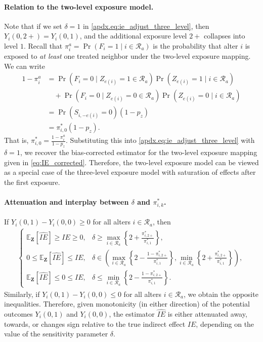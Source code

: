 \documentclass[11pt]{article}
\theoremstyle{definition}
\def \bZ {\boldsymbol{Z}}
\def \cR {\mathcal{R}}
\def \EX {\mathbb{E}}
\begin{document}
\paragraph{Relation to the two-level exposure model.}
Note that if we set $\delta=1$ in \eqref{apdx.eq:ie_adjust_three_level},
then $Y_i(0,2+) = Y_i(0,1)$, and 
the additional exposure level $2+$ collapses into level $1$.
Recall that $\pi_i^a = \Pr(F_i=1 \mid i \in \cR_a)$ is the probability
that alter $i$ is exposed to \emph{at least} one treated neighbor under the two-level exposure mapping.
We can write 
\begin{equation*}
    \begin{aligned}
        1 - \pi_i^a 
        &= \Pr(F_i=0 \mid Z_{e(i)}=1 \in \cR_a)\Pr(Z_{e(i)}=1 \mid i \in \cR_a) 
        \\ & \quad +
        \Pr(F_i=0 \mid Z_{e(i)}=0 \in \cR_a)\Pr(Z_{e(i)}=0 \mid i \in \cR_a) 
        \\  &= 
         \Pr(S_{i, -e(i)}=0)(1-p_z)
         \\ &= 
          \pi_{i,0}^* (1-p_z).
    \end{aligned}
\end{equation*}
That is, $\pi_{i,0}^* = \frac{1 - \pi_i^a}{1-p_z}$.
Substituting this into \eqref{apdx.eq:ie_adjust_three_level} with $\delta=1$,
we recover the bias-corrected estimator for the two-level exposure mapping
given in \eqref{eq:IE_corrected}.
Therefore, the two-level exposure model can be 
viewed as a special case of the three-level exposure model
with saturation of effects after the first exposure.

\paragraph{Attenuation and interplay between $\delta$ and $\pi_{i,k}^*$.}
If $Y_i(0,1) - Y_i(0,0) \geq 0$ for all alters $i \in \cR_a$, then
\begin{align*}
    \begin{cases}
        \EX_{\bZ}\left[\widehat{IE}\right] \geq IE \geq 0, & 
            \delta \geq \max_{i \in \cR_a}\left\{2 + \frac{\pi_{i,2+}^*}{\pi_{i,1}^*}\right\}, \\
        0 \leq \EX_{\bZ}\left[\widehat{IE}\right] \leq IE, & 
            \delta \in \left( \max_{i \in \cR_a}\left\{ 
              2 - \frac{1 - \pi_{i,2+}^*}{\pi_{i,1}^*} \right\}, 
                \min_{i \in \cR_a}\left\{2 + \frac{\pi_{i,2+}^*}{\pi_{i,1}^*}\right\} \right), \\
        \EX_{\bZ}\left[\widehat{IE}\right] \leq 0 \leq IE, & 
            \delta \leq \min_{i \in \cR_a}\left\{ 2 - \frac{1 - \pi_{i,2+}^*}{\pi_{i,1}^*} \right\}. 
    \end{cases}
\end{align*}
Similarly, if $Y_i(0,1) - Y_i(0,0) \leq 0$ for all alters $i \in \cR_a$, we obtain the opposite inequalities.
Therefore, given monotonicity (in either direction) of the potential outcomes $Y_i(0,1)$ and $Y_i(0,0)$, 
the estimator $\widehat{IE}$ is either attenuated away, towards, or changes sign relative to the true indirect effect $IE$,
 depending on the value of the sensitivity parameter $\delta$.
\end{document}
